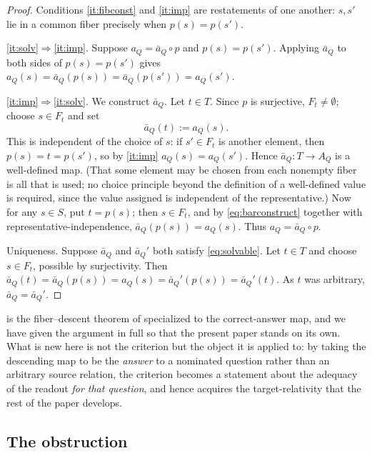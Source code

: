 \documentclass[11pt,reqno]{amsart}
\theoremstyle{plain}
\theoremstyle{definition}
\newcommand{\Src}{S}
\newcommand{\Rdt}{T}
\begin{document}
\begin{proof}
Conditions \eqref{it:fibconst} and \eqref{it:imp} are restatements of one another: $s,s'$ lie in
a common fiber precisely when $p(s)=p(s')$.

\eqref{it:solv}$\Rightarrow$\eqref{it:imp}. Suppose $a_Q=\bar a_Q\circ p$ and $p(s)=p(s')$.
Applying $\bar a_Q$ to both sides of $p(s)=p(s')$ gives
$a_Q(s)=\bar a_Q(p(s))=\bar a_Q(p(s'))=a_Q(s')$.

\eqref{it:imp}$\Rightarrow$\eqref{it:solv}. We construct $\bar a_Q$. Let $t\in\Rdt$. Since $p$ is
surjective, $F_t\neq\emptyset$; choose $s\in F_t$ and set
\begin{equation}\label{eq:barconstruct}
\bar a_Q(t) := a_Q(s).
\end{equation}
This is independent of the choice of $s$: if $s'\in F_t$ is another element, then $p(s)=t=p(s')$,
so by \eqref{it:imp} $a_Q(s)=a_Q(s')$. Hence $\bar a_Q\colon\Rdt\to A_Q$ is a well-defined map.
(That some element may be chosen from each nonempty fiber is all that is used; no choice
principle beyond the definition of a well-defined value is required, since the value assigned is
independent of the representative.) Now for any $s\in\Src$, put $t=p(s)$; then $s\in F_t$, and by
\eqref{eq:barconstruct} together with representative-independence, $\bar a_Q(p(s))=a_Q(s)$. Thus
$a_Q=\bar a_Q\circ p$.

Uniqueness. Suppose $\bar a_Q$ and $\bar a_Q'$ both satisfy \eqref{eq:solvable}. Let $t\in\Rdt$
and choose $s\in F_t$, possible by surjectivity. Then
$\bar a_Q(t)=\bar a_Q(p(s))=a_Q(s)=\bar a_Q'(p(s))=\bar a_Q'(t)$. As $t$ was arbitrary,
$\bar a_Q=\bar a_Q'$.
\end{proof}

 is the fiber--descent theorem of \cite{ShadowI} specialized to the
correct-answer map, and we have given the argument in full so that the present paper stands on
its own. What is new here is not the criterion but the object it is applied to: by taking the
descending map to be the \emph{answer} to a nominated question rather than an arbitrary source
relation, the criterion becomes a statement about the adequacy of the readout \emph{for that
question}, and hence acquires the target-relativity that the rest of the paper develops.

\subsection{The obstruction}
\end{document}
